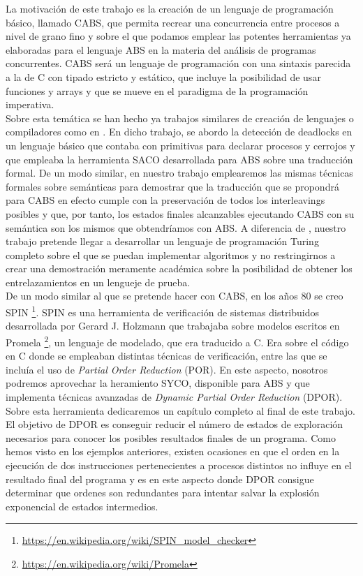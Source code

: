 La motivación de este trabajo es la creación de un lenguaje de programación básico, llamado CABS, que permita recrear una concurrencia entre procesos a nivel de grano fino y sobre el que podamos emplear las potentes herramientas ya elaboradas para el lenguaje ABS en la materia del análisis de programas concurrentes. CABS será un lenguaje de programación con una sintaxis parecida a la de C con tipado estricto y estático, que incluye la posibilidad de usar funciones y arrays y que se mueve en el paradigma de la programación imperativa.\\

Sobre esta temática se han hecho ya trabajos similares de creación de lenguajes o compiladores como en \cite{Alicia}. En dicho trabajo, se abordo la detección de deadlocks en un lenguaje básico que contaba con primitivas para declarar procesos y cerrojos y que empleaba la herramienta SACO desarrollada para ABS sobre una traducción formal. De un modo similar, en nuestro trabajo emplearemos las mismas técnicas formales sobre semánticas para demostrar que la traducción que se propondrá para CABS en efecto cumple con la preservación de todos los interleavings posibles y que, por tanto, los estados finales alcanzables ejecutando CABS con su semántica son los mismos que obtendríamos con ABS. A diferencia de \cite{Alicia}, nuestro trabajo pretende llegar a desarrollar un lenguaje de programación Turing completo sobre el que se puedan implementar algoritmos y no restringirnos a crear una demostración meramente académica sobre la posibilidad de obtener los entrelazamientos en un lengueje de prueba.\\

De un modo similar al que se pretende hacer con CABS, en los años 80 se creo SPIN \footnote{\url{https://en.wikipedia.org/wiki/SPIN_model_checker}}. SPIN es una herramienta de verificación de sistemas distribuidos desarrollada por Gerard J. Holzmann que trabajaba sobre modelos escritos en Promela \footnote{\url{https://en.wikipedia.org/wiki/Promela}}, un lenguaje de modelado, que era traducido a C. Era sobre el código en C donde se empleaban distintas técnicas de verificación, entre las que se incluía el uso de \emph{Partial Order Reduction} (POR). En este aspecto, nosotros podremos aprovechar la heramiento SYCO, disponible para ABS y que implementa técnicas avanzadas de \emph{Dynamic Partial Order Reduction} (DPOR). Sobre esta herramienta dedicaremos un capítulo completo al final de este trabajo. El objetivo de DPOR es conseguir reducir el número de estados de exploración necesarios para conocer los posibles resultados finales de un programa. Como hemos visto en los ejemplos anteriores, existen ocasiones en que el orden en la ejecución de dos instrucciones pertenecientes a procesos distintos no influye en el resultado final del programa y es en este aspecto donde DPOR consigue determinar que ordenes son redundantes para intentar salvar la explosión exponencial de estados intermedios.\\

